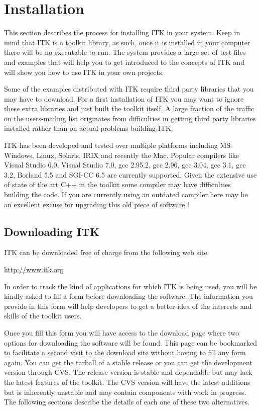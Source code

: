 \chapter{Installation}
\label{chapter:Installation}

This section describes the process for installing ITK in your system. Keep in
mind that ITK is a toolkit library, as such, once it is installed in your
computer there will be no executable to run. The system provides a large set of
test files and examples that will help you to get introduced to the concepts of
ITK and will show you how to use ITK in your own projects.

Some of the examples distributed with ITK require third party libraries that
you may have to download. For a first installation of ITK you may want to
ignore these extra libraries and just built the toolkit itself. A large
fraction of the traffic on the users-mailing list originates from difficulties
in getting third party libraries installed rather than on actual problems
building ITK.

ITK has been developed and tested over multiple platforms including MS-Windows,
Linux, Solaris, IRIX and recently the Mac. Popular compilers like Visual Studio
6.0, Visual Studio 7.0, gcc 2.95.2, gcc 2.96, gcc 3.04, gcc 3.1, gcc 3.2,
Borland 5.5 and SGI-CC 6.5 are currently supported. Given the extensive use of
state of the art C++ in the toolkit some compiler may have difficulties
building the code. If you are currently using an outdated compiler here may be
an excellent excuse for upgrading this old piece of software !


\section{Downloading ITK}
\label{sec:DownloadingITK}
 
ITK can be downloaded free of charge from the following web site:
\begin{center} 
  \url{http://www.itk.org}
\end{center}
In order to track the kind of applications for which ITK is being used, you
will be kindly asked to fill a form before downloading the software.
The information you provide in this form will help developers to get a better
idea of the interests and skills of the toolkit users. 

Once you fill this form you will have access to the download page where two
options for downloading the software will be found. This page can be bookmarked
to facilitate a second visit to the download site without having to fill any
form again. You can get the tarball of a stable release or you can get the
development version through CVS.  The release version is stable and dependable
but may lack the latest features of the toolkit. The CVS version will have the
latest additions but is inherently unstable and may contain components with
work in progress.  The following sections describe the details of each one of
these two alternatives.

